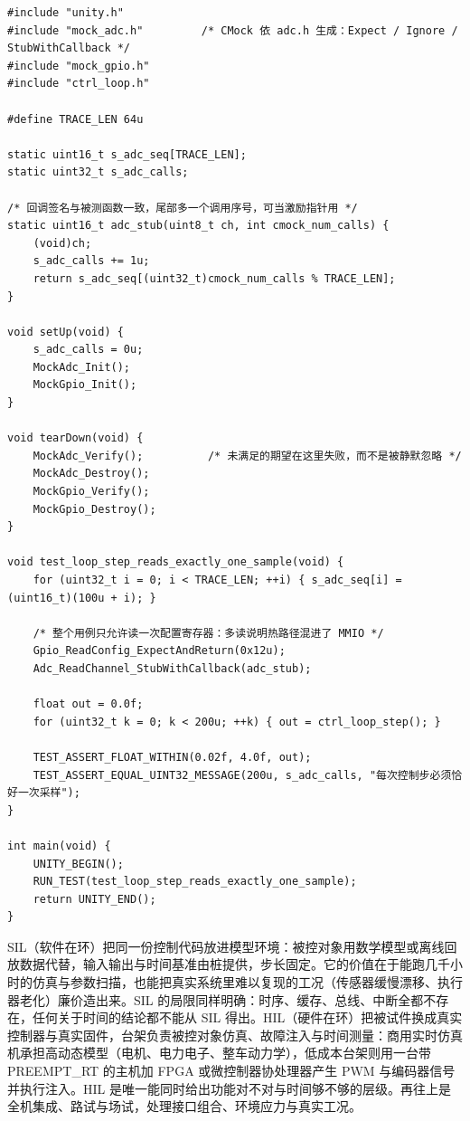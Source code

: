 \documentclass[12pt,a4paper,fontset=fandol]{ctexbook}
\begin{document}
\begin{lstlisting}[style=cstyle,caption={C：Unity 风格的单元测试与硬件层桩化（模拟对象由 CMock 依头文件生成）},label={lst:ch14-unity}]
#include "unity.h"
#include "mock_adc.h"         /* CMock 依 adc.h 生成：Expect / Ignore / StubWithCallback */
#include "mock_gpio.h"
#include "ctrl_loop.h"

#define TRACE_LEN 64u

static uint16_t s_adc_seq[TRACE_LEN];
static uint32_t s_adc_calls;

/* 回调签名与被测函数一致，尾部多一个调用序号，可当激励指针用 */
static uint16_t adc_stub(uint8_t ch, int cmock_num_calls) {
    (void)ch;
    s_adc_calls += 1u;
    return s_adc_seq[(uint32_t)cmock_num_calls % TRACE_LEN];
}

void setUp(void) {
    s_adc_calls = 0u;
    MockAdc_Init();
    MockGpio_Init();
}

void tearDown(void) {
    MockAdc_Verify();          /* 未满足的期望在这里失败，而不是被静默忽略 */
    MockAdc_Destroy();
    MockGpio_Verify();
    MockGpio_Destroy();
}

void test_loop_step_reads_exactly_one_sample(void) {
    for (uint32_t i = 0; i < TRACE_LEN; ++i) { s_adc_seq[i] = (uint16_t)(100u + i); }

    /* 整个用例只允许读一次配置寄存器：多读说明热路径混进了 MMIO */
    Gpio_ReadConfig_ExpectAndReturn(0x12u);
    Adc_ReadChannel_StubWithCallback(adc_stub);

    float out = 0.0f;
    for (uint32_t k = 0; k < 200u; ++k) { out = ctrl_loop_step(); }

    TEST_ASSERT_FLOAT_WITHIN(0.02f, 4.0f, out);
    TEST_ASSERT_EQUAL_UINT32_MESSAGE(200u, s_adc_calls, "每次控制步必须恰好一次采样");
}

int main(void) {
    UNITY_BEGIN();
    RUN_TEST(test_loop_step_reads_exactly_one_sample);
    return UNITY_END();
}
\end{lstlisting}

SIL（软件在环）把同一份控制代码放进模型环境：被控对象用数学模型或离线回放数据代替，输入输出与时间基准由桩提供，步长固定。它的价值在于能跑几千小时的仿真与参数扫描，也能把真实系统里难以复现的工况（传感器缓慢漂移、执行器老化）廉价造出来。SIL 的局限同样明确：时序、缓存、总线、中断全都不存在，任何关于时间的结论都不能从 SIL 得出。HIL（硬件在环）把被试件换成真实控制器与真实固件，台架负责被控对象仿真、故障注入与时间测量：商用实时仿真机承担高动态模型（电机、电力电子、整车动力学），低成本台架则用一台带 PREEMPT\_RT 的主机加 FPGA 或微控制器协处理器产生 PWM 与编码器信号并执行注入。HIL 是唯一能同时给出功能对不对与时间够不够的层级。再往上是全机集成、路试与场试，处理接口组合、环境应力与真实工况。
\end{document}
